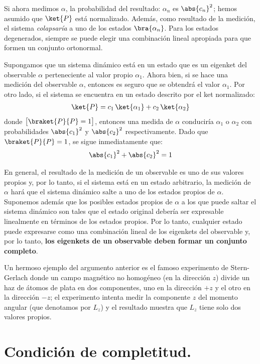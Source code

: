 Si ahora medimos $\alpha$, la probabilidad del resultado: $\alpha_{n}$ es $\abs{c_{n}}^{2}$; hemos asumido que $\ket{P}$ está normalizado. Además, como resultado de la medición, el sistema \emph{colapsaría} a uno de los estados $\bra{\alpha_{n}}$. Para los estados degenerados, siempre se puede elegir una combinación lineal apropiada para que formen un conjunto ortonormal.
\par
Supongamos que un sistema dinámico está en un estado que es un eigenket del observable $\alpha$ perteneciente al valor propio $\alpha_{1}$. Ahora bien, si se hace una medición del observable $\alpha$, entonces es seguro que se obtendrá el valor $\alpha_{1}$. Por otro lado, si el sistema se encuentra en un estado descrito por el ket normalizado:
\begin{align*}
\ket{P} = c_{1} \, \ket{\alpha_{1}} + c_{2} \, \ket{\alpha_{2}}
\end{align*}
donde $\big[ \braket{P}{P} = 1 \big]$, entonces una medida de $\alpha$ conduciría $\alpha_{1}$ o $\alpha_{2}$ con probabilidades $\abs{c_{1}}^{2}$ y $\abs{c_{2}}^{2}$ respectivamente. Dado que $\braket{P}{P} = 1$, se sigue inmediatamente que:
\begin{align}
\abs{c_{1}}^{2} + \abs{c_{2}}^{2} = 1
\label{eq:ecuacion_38}
\end{align}

En general, el resultado de la medición de un observable es uno de sus valores propios y, por lo tanto, si el sistema está en un estado arbitrario, la medición de $\alpha$ hará que el sistema dinámico salte a uno de los estados propios de $\alpha$. Suponemos además que los posibles estados propios de $\alpha$ a los que puede saltar el sistema dinámico son tales que el estado original debería ser expresable linealmente en términos de los estados propios. Por lo tanto, cualquier estado puede expresarse como una combinación lineal de los eigenkets del observable y, por lo tanto, \textbf{los eigenkets de un observable deben formar un conjunto completo}.
\par
Un hermoso ejemplo del argumento anterior es el famoso experimento de Stern-Gerlach donde un campo magnético no homogéneo (en la dirección $z$) divide un haz de átomos de plata en dos componentes, uno en la dirección $+z$ y el otro en la dirección $-z$; el experimento intenta medir la componente $z$ del momento angular (que denotamos por $L_{z}$) y el resultado muestra que $L_{z}$ tiene solo dos valores propios.

\section{Condición de completitud.}

